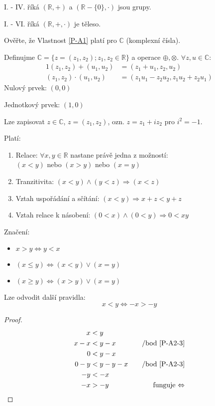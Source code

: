 I. - IV. říká $(\mathbb{R}, +)$ a $(\mathbb{R} - \{0\}, \cdot)$ jsou grupy.

I. - VI. říká $(\mathbb{R}, +, \cdot)$ je těleso.

Ověřte, že Vlastnost \ref{P-A1} platí pro $\mathbb{C}$ (komplexní čísla).

\begin{example}
	Definujme $\mathbb{C} = \{z = (z_1, z_2); z_1, z_2 \in \mathbb{R}\}$ a
	operace $\oplus, \otimes$. $\forall z, u \in \mathbb{C}:$
	\begin{alignat}{1}
		(z_1, z_2) + (u_1, u_2) &= (z_1 + u_1, z_2, u_2) \\
		(z_1, z_2) \cdot (u_1, u_2) &= (z_1u_1 - z_2u_2, z_1u_2 + z_2u_1)
	\end{alignat}
	Nulový prvek: $(0, 0)$
	
	Jednotkový prvek: $(1, 0)$

	Lze zapisovat $z\in \mathbb{C}$, $z = (z_1, z_2)$, ozn. $z = z_1 + iz_2$ pro $i^2 = -1$.
\end{example}
\begin{property}[Uspořádání]\label{P-A2}
	Platí:

	\begin{enumerate}[I]
		\item Relace: $\forall x, y \in \mathbb{R}$ nastane právě jedna z možností: \\
		$(x<y)$ nebo $(x>y)$ nebo $(x=y)$
		\item Tranzitivita: $(x<y) \land (y<z) \Rightarrow (x<z)$
		\item\label{P-A2-3} Vztah uspořádání a sčítání: $(x<y) \Rightarrow x+z < y+z$
		\item\label{P-A2-4} Vztah relace k násobení: $(0<x) \land (0<y) \Rightarrow 0 < xy$
	\end{enumerate}
\end{property}

Značení:
\begin{itemize}
	\item $x>y \Leftrightarrow y<x$
	\item $(x\leq y) \Leftrightarrow (x<y) \lor (x=y)$
	\item $(x\geq y) \Leftrightarrow (x>y) \lor (x=y)$
\end{itemize}

Lze odvodit další pravidla:
\begin{equation}\label{RelationsOfNegatives}
	x<y \Leftrightarrow -x > -y
\end{equation}
\begin{proof}
	\begin{alignat*}{2}
		x&<y \\
		x-x&<y-x &\text{\quad /bod \ref{P-A2-3}} \\
		0&<y-x \\
		0-y&<y-y-x &\text{\quad /bod \ref{P-A2-3}} \\
		-y&<-x \\
		-x&>-y &\text{\quad funguje $\Leftrightarrow$} \\
	\end{alignat*}
\end{proof}

